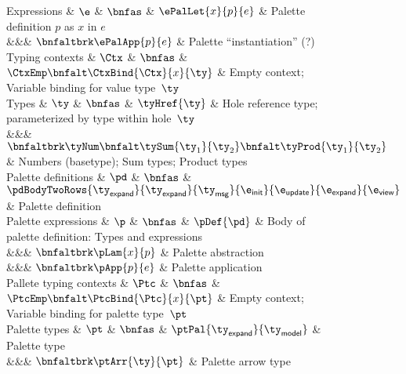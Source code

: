\begin{figure*}
\begin{grammar}
 Expressions 
 & $\e$ 
   & $\bnfas$ &
     $\ePalLet{x}{p}{e}$ & Palette definition $p$ as $x$ in $e$
 \\ &&& $\bnfaltbrk \ePalApp{p}{e}$ & Palette ``instantiation'' (?)
%
\\[1ex]
Typing contexts
 & $\Ctx$
   & $\bnfas$ &
    $\CtxEmp \bnfalt \CtxBind{\Ctx}{x}{\ty}$ & Empty context; Variable binding for value type~$\ty$
\\
Types
 & $\ty$
   & $\bnfas$ &
    $\tyHref{\ty}$ & Hole reference type; parameterized by type within hole~$\ty$
\\ &&& $\bnfaltbrk \tyNum \bnfalt \tySum{\ty_1}{\ty_2} \bnfalt \tyProd{\ty_1}{\ty_2}$ & Numbers (basetype); Sum types; Product types
%
\\[1ex]
 Palette definitions
 & $\pd$
   & $\bnfas$ &
    $\pdBodyTwoRows{\ty_{\textsf{expand}}}{\ty_{\textsf{expand}}}{\ty_{\textsf{msg}}}{\e_{\textsf{init}}}{\e_{\textsf{update}}}{\e_{\textsf{expand}}}{\e_{\textsf{view}}}$ & Palette definition
%
\\[2ex]
 Palette expressions
 & $\p$
   & $\bnfas$ &
    $\pDef{\pd}$ & Body of palette definition: Types and expressions
\\ &&& $\bnfaltbrk \pLam{x}{p}$ & Palette abstraction
\\ &&& $\bnfaltbrk \pApp{p}{e}$ & Palette application
%
\\[1ex]
Pallete typing contexts
 & $\Ptc$
   & $\bnfas$ &
     $\PtcEmp \bnfalt \PtcBind{\Ptc}{x}{\pt}$ & Empty context; Variable binding for palette type~$\pt$
\\
Palette types
 & $\pt$
   & $\bnfas$ &
    $\ptPal{\ty_{\textsf{expand}}}{\ty_{\textsf{model}}}$ & Palette type
\\ &&& $\bnfaltbrk \ptArr{\ty}{\pt}$ & Palette arrow type
\end{grammar}
\end{figure*}




